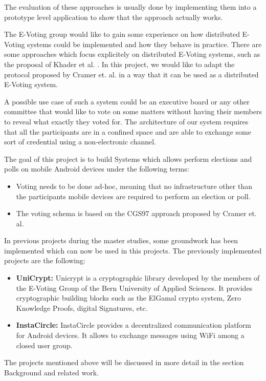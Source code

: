 \documentclass[numbers=noenddot, abstract=on]{scrreprt}
\begin{document}
The evaluation of these approaches is usually done by implementing them into a
prototype level application to show that the approach actually works.

The E-Voting group would like to gain some experience on how distributed
E-Voting systems could be implemented and how they behave in practice. There are
some approaches which focus explicitely on distributed E-Voting systems, such as
the proposal of Khader et al. \cite{HKRS12}. In this project, we would like to
adapt the protocol proposed by Cramer et. al. \cite{CGS97} in a way that it can
be used as a distributed E-Voting system.

A possible use case of such a system could be an executive board or any other
committee that would like to vote on some matters without having their members
to reveal what exactly they voted for. The architecture of our system requires
that all the participants are in a confined space and are able to exchange some
sort of credential using a non-electronic channel.

The goal of this project is to build Systems which allows perform elections and
polls on mobile Android devices under the following terms:
\begin{itemize}
  \item Voting needs to be done ad-hoc, meaning that no infrastructure other
  than the participants mobile devices are required to perform an election or
  poll.
  \item The voting schema is based on the CGS97 approach proposed by Cramer et.
  al. \cite{CGS97}
\end{itemize}

In previous projects during the master studies, some groundwork has been
implemented which can now be used in this projects. The previously implemented
projects are the following:
\begin{itemize}
  \item \textbf{UniCrypt:} Unicrypt is a cryptographic library developed by the
  members of the E-Voting Group of the Bern University of Applied Sciences. It
  provides cryptographic building blocks such as the ElGamal crypto system, Zero
  Knowledge Proofs, digital Signatures, etc. 
  \item \textbf{InstaCircle: } InstaCircle provides a decentralized
  communication platform for Android devices. It allows to exchange messages
  using WiFi among a closed user group.
\end{itemize}
The projects mentioned above will be discussed in more detail in the section
Background and related work.
\end{document}
